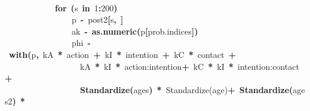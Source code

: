 \documentclass{article}
\makeatletter
\newcommand{\hlnumber}[1]{\textcolor[rgb]{0,0,0}{#1}}%
\newcommand{\hlfunctioncall}[1]{\textcolor[rgb]{.5,0,.33}{\textbf{#1}}}%
\newcommand{\hlkeyword}[1]{\textbf{#1}}%
\newcommand{\hlassignement}[1]{\textbf{#1}}%
\newcommand{\hlsymbol}[1]{#1}%
\newcommand{\hlstd}[1]{\textcolor[rgb]{0,0,0}{#1}}%
\newenvironment{kframe}{%
 \def\FrameCommand##1{\hskip\@totalleftmargin \hskip-\fboxsep
 \colorbox{shadecolor}{##1}\hskip-\fboxsep
     \hskip-\linewidth \hskip-\@totalleftmargin \hskip\columnwidth}%
 \MakeFramed {\advance\hsize-\width
   \@totalleftmargin\z@ \linewidth\hsize
   \@setminipage}}%
 {\par\unskip\endMakeFramed}
\newenvironment{knitrout}{}{} %
\makeatother
\begin{document}
\begin{knitrout}
{\begin{kframe}
\begin{flushleft}
\hlstd{}\hspace*{\fill}\\
\hlstd{}{\ }{\ }{\ }{\ }{\ }{\ }{\ }{\ }{\ }{\ }{\ }{\ }\hlkeyword{for}{\ }\hlkeyword{(}\hlsymbol{s}{\ }\hlkeyword{in}{\ }\hlnumber{1}\hlkeyword{:}\hlnumber{200}\hlkeyword{)}{\ }\hlkeyword{\usebox{\hlnormalsizeboxopenbrace}}\hspace*{\fill}\\
\hlstd{}{\ }{\ }{\ }{\ }{\ }{\ }{\ }{\ }{\ }{\ }{\ }{\ }{\ }{\ }{\ }{\ }\hlsymbol{p}{\ }\hlassignement{\usebox{\hlnormalsizeboxlessthan}-}{\ }\hlsymbol{post2}\hlkeyword{[}\hlsymbol{s}\hlkeyword{,}{\ }\hlkeyword{]}\hspace*{\fill}\\
\hlstd{}{\ }{\ }{\ }{\ }{\ }{\ }{\ }{\ }{\ }{\ }{\ }{\ }{\ }{\ }{\ }{\ }\hlsymbol{ak}{\ }\hlassignement{\usebox{\hlnormalsizeboxlessthan}-}{\ }\hlfunctioncall{as.numeric}\hlkeyword{(}\hlsymbol{p}\hlkeyword{[}\hlsymbol{prob.indices}\hlkeyword{]}\hlkeyword{)}\hspace*{\fill}\\
\hlstd{}{\ }{\ }{\ }{\ }{\ }{\ }{\ }{\ }{\ }{\ }{\ }{\ }{\ }{\ }{\ }{\ }\hlsymbol{phi}{\ }\hlassignement{\usebox{\hlnormalsizeboxlessthan}-}{\ }\hlfunctioncall{with}\hlkeyword{(}\hlsymbol{p}\hlkeyword{,}{\ }\hlsymbol{kA}{\ }\hlkeyword{*}{\ }\hlsymbol{action}{\ }\hlkeyword{+}{\ }\hlsymbol{kI}{\ }\hlkeyword{*}{\ }\hlsymbol{intention}{\ }\hlkeyword{+}{\ }\hlsymbol{kC}{\ }\hlkeyword{*}{\ }\hlsymbol{contact}{\ }\hlkeyword{+}\hspace*{\fill}\\
\hlstd{}{\ }{\ }{\ }{\ }{\ }{\ }{\ }{\ }{\ }{\ }{\ }{\ }{\ }{\ }{\ }{\ }{\ }{\ }\hlsymbol{kA}{\ }\hlkeyword{*}{\ }\hlsymbol{kI}{\ }\hlkeyword{*}{\ }\hlsymbol{\usebox{\hlnormalsizeboxbacktick}action:intention\usebox{\hlnormalsizeboxbacktick}}{\ }\hlkeyword{+}{\ }\hlsymbol{kC}{\ }\hlkeyword{*}{\ }\hlsymbol{kI}{\ }\hlkeyword{*}{\ }\hlsymbol{\usebox{\hlnormalsizeboxbacktick}intention:contact\usebox{\hlnormalsizeboxbacktick}}{\ }\hlkeyword{+}\hspace*{\fill}\\
\hlstd{}{\ }{\ }{\ }{\ }{\ }{\ }{\ }{\ }{\ }{\ }{\ }{\ }{\ }{\ }{\ }{\ }{\ }{\ }\hlfunctioncall{Standardize}\hlkeyword{(}\hlsymbol{ages}\hlkeyword{)}{\ }\hlkeyword{*}{\ }\hlsymbol{\usebox{\hlnormalsizeboxbacktick}Standardize(age)\usebox{\hlnormalsizeboxbacktick}}{\ }\hlkeyword{+}{\ }\hlfunctioncall{Standardize}\hlkeyword{(}\hlsymbol{ages}\hlkeyword{\usebox{\hlnormalsizeboxhat}}\hlnumber{2}\hlkeyword{)}{\ }\hlkeyword{*}\hspace*{\fill}\\

\end{flushleft}
\end{kframe}}
\end{knitrout}
\end{document}
